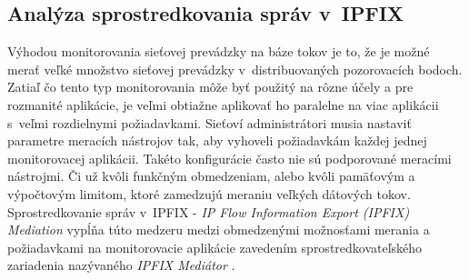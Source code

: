 \subsection{Anal\'yza sprostredkovania spr\'av v~IPFIX}

Výhodou monitorovania sieťovej prevádzky na báze tokov je to, že je možné merať 
veľké množstvo sieťovej prevádzky v~distribuovaných pozorovacích bodoch. 
Zatiaľ čo tento typ monitorovania môže byť použitý na rôzne účely a pre rozmanité aplikácie, je veľmi 
obtiažne aplikovať ho paralelne na viac aplikácii s~veľmi rozdielnymi požiadavkami.
Sieťoví administrátori musia nastaviť parametre meracích nástrojov tak, aby vyhoveli požiadavkám každej
jednej monitorovacej aplikácii. Takéto konfigurácie často nie sú podporované meracími nástrojmi. Či už
kvôli funkčným obmedzeniam, alebo kvôli pamäťovým a výpočtovým limitom, ktoré zamedzujú meraniu veľkých 
dátových tokov. Sprostredkovanie správ v~IPFIX - \emph{IP Flow Information Export (IPFIX) Mediation}
vypĺňa túto medzeru medzi obmedzenými možnosťami merania a požiadavkami na monitorovacie aplikácie 
zavedením sprostredkovateľského zariadenia nazývaného \emph{IPFIX Mediátor} \citep{rfc5982}.

